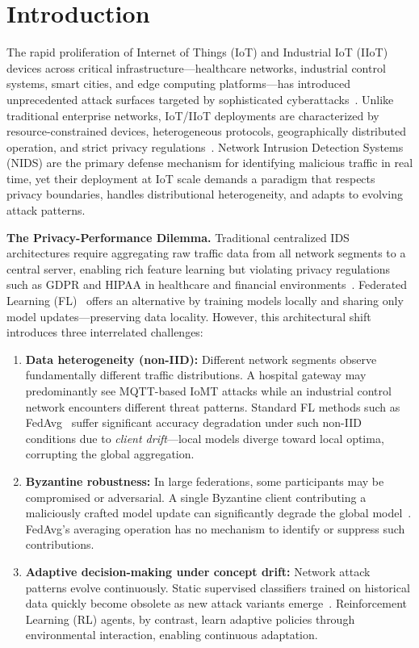 \documentclass[conference]{IEEEtran}
\begin{document}
\section{Introduction}
\label{sec:introduction}

The rapid proliferation of Internet of Things (IoT) and Industrial IoT (IIoT) devices across critical infrastructure---healthcare networks, industrial control systems, smart cities, and edge computing platforms---has introduced unprecedented attack surfaces targeted by sophisticated cyberattacks~\cite{sfedrl, drl_iiot}. Unlike traditional enterprise networks, IoT/IIoT deployments are characterized by resource-constrained devices, heterogeneous protocols, geographically distributed operation, and strict privacy regulations~\cite{prifeds}. Network Intrusion Detection Systems (NIDS) are the primary defense mechanism for identifying malicious traffic in real time, yet their deployment at IoT scale demands a paradigm that respects privacy boundaries, handles distributional heterogeneity, and adapts to evolving attack patterns.

\textbf{The Privacy-Performance Dilemma.} Traditional centralized IDS architectures require aggregating raw traffic data from all network segments to a central server, enabling rich feature learning but violating privacy regulations such as GDPR and HIPAA in healthcare and financial environments~\cite{prifeds}. Federated Learning (FL)~\cite{fedplus} offers an alternative by training models locally and sharing only model updates---preserving data locality. However, this architectural shift introduces three interrelated challenges:

\begin{enumerate}[label=(\roman*)]
    \item \textbf{Data heterogeneity (non-IID):} Different network segments observe fundamentally different traffic distributions. A hospital gateway may predominantly see MQTT-based IoMT attacks while an industrial control network encounters different threat patterns. Standard FL methods such as FedAvg~\cite{fedavg} suffer significant accuracy degradation under such non-IID conditions due to \emph{client drift}---local models diverge toward local optima, corrupting the global aggregation.

    \item \textbf{Byzantine robustness:} In large federations, some participants may be compromised or adversarial. A single Byzantine client contributing a maliciously crafted model update can significantly degrade the global model~\cite{fltrust}. FedAvg's averaging operation has no mechanism to identify or suppress such contributions.

    \item \textbf{Adaptive decision-making under concept drift:} Network attack patterns evolve continuously. Static supervised classifiers trained on historical data quickly become obsolete as new attack variants emerge~\cite{fedrl_adaptive}. Reinforcement Learning (RL) agents, by contrast, learn adaptive policies through environmental interaction, enabling continuous adaptation.
\end{enumerate}
\end{document}
